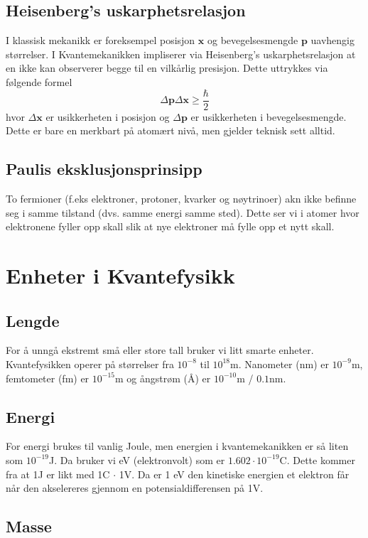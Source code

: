 \subsection{Heisenberg's uskarphetsrelasjon}
I klassisk mekanikk er foreksempel posisjon $ \mathbf{x} $ og bevegelsesmengde $ \mathbf{p} $ uavhengig størrelser. I Kvantemekanikken impliserer via Heisenberg's uskarphetsrelasjon at en ikke kan observerer begge til en vilkårlig presisjon. Dette uttrykkes via følgende formel
\begin{equation}
Δ \mathbf{p} Δ\mathbf{x} \geq \frac{ℏ}{2}
\end{equation}
hvor $ Δ\mathbf{x} $ er usikkerheten i posisjon og $ Δ\mathbf{p} 
$ er usikkerheten i bevegelsesmengde. Dette er bare en merkbart på atomært nivå, men gjelder teknisk sett alltid. 

\subsection{Paulis eksklusjonsprinsipp}
To fermioner (f.eks elektroner, protoner, kvarker og nøytrinoer) akn ikke befinne seg i samme tilstand (dvs. samme energi samme sted). Dette ser vi i atomer hvor elektronene fyller opp skall slik at nye elektroner må fylle opp et nytt skall. 



\section{Enheter i Kvantefysikk}
\subsection{Lengde}
For å unngå ekstremt små eller store tall bruker vi litt smarte enheter. Kvantefysikken operer på størrelser fra $ 10^{-8} $ til $ 10^{18} $m. Nanometer (nm) er $ 10^{-9} $m, femtometer (fm) er $ 10^{-15} $m og ångstrøm (Å) er $ 10^{-10} $m / $ 0.1 $nm.

\subsection{Energi}
For energi brukes til vanlig Joule, men energien i kvantemekanikken er så liten som $ 10^{-19} $J. Da bruker vi eV (elektronvolt) som er $ 1.602 \cdot 10^{-19} $C. Dette kommer fra at 1J er likt med 1C $\cdot$ 1V. Da er 1 eV den kinetiske energien et elektron får når den akselereres gjennom en potensialdifferensen på 1V. 

\subsection{Masse}

